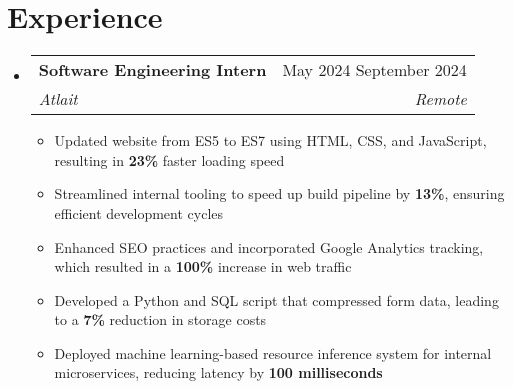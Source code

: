 \documentclass[letterpaper, 11pt]{article}
\makeatletter
\newcommand{\resumeItem}[1]{
    \item \small {
        {#1 \vspace{-3pt}} %
    }
}
\newcommand{\resumeSubheading}[4]{ %
  \vspace{-2pt}\item
    \begin{tabular*}{0.99\textwidth}[t]{l@{\extracolsep{\fill}}r}
      \textbf{#1} & #2 \\
      \textit{\small#3} & \textit{\small #4} \\
    \end{tabular*}\vspace{-7pt}
}
\newcommand{\resumeSubHeadingListStart}{\begin{itemize}[leftmargin=0.15in, label={}]}
\newcommand{\resumeSubHeadingListEnd}{\end{itemize}}
\newcommand{\resumeItemListStart}{\begin{itemize}}
\newcommand{\resumeItemListEnd}{\end{itemize}\vspace{-10pt}}
\makeatother
\begin{document}
\vspace{-25pt}

\section{Experience}
    \resumeSubHeadingListStart{}
        \resumeSubheading %
        {Software Engineering Intern}{May 2024 \textendash{} September 2024}
        {Atlait}{Remote}
        \resumeItemListStart{}
            \resumeItem{Updated website from ES5 to ES7 using HTML, CSS, and JavaScript, resulting in \textbf{23\%} faster loading speed}
            \resumeItem{Streamlined internal tooling to speed up build pipeline by \textbf{13\%}, ensuring efficient development cycles}
            \resumeItem{Enhanced SEO practices and incorporated Google Analytics tracking, which resulted in a \textbf{100\%} increase in web traffic}
            \resumeItem{Developed a Python and SQL script that compressed form data, leading to a \textbf{7\%} reduction in storage costs}
            \resumeItem{Deployed machine learning-based resource inference system for internal microservices, reducing latency by \textbf{100 milliseconds}}
        \resumeItemListEnd{}
    \resumeSubHeadingListEnd{}

\vspace{-27pt}

\end{document}
